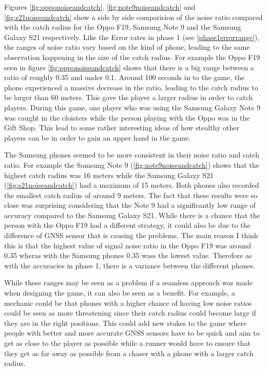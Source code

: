 \documentclass{l4proj}
\begin{document}
Figures \ref{fig:opponoiseandcatch}, \ref{fig:note9noiseandcatch} and \ref{fig:s21noiseandcatch} show a side by side comparision of the
noise ratio compared with the catch radius for the Oppo F19, Samsung Note 9 and the Samsung Galaxy S21 respectively. Like the Error rates in
phase 1 (see \ref{phase1errorrange}), the ranges of noise ratio vary based on the kind of phone, leading to the same observation happening in
the size of the catch radius. For example the Oppo F19 seen in figure \ref{fig:opponoiseandcatch} shows that there is a big range between a ratio
of roughly 0.35 and under 0.1. Around 100 seconds in to the game, the phone experienced a massive decrease in the ratio, leading to the catch radius
to be larger than 60 meters. This gave the player a larger radius in order to catch players. During this game, one player who was using the Samsung
Galaxy Note 9 was caught in the cloisters while the person playing with the Oppo was in the Gift Shop. This lead to some rather interesting ideas
of how stealthy other players can be in order to gain an upper hand in the game.

The Samsung phones seemed to be more consistent in their noise ratio and catch ratio. For example the Samsung Note 9 (\ref{fig:note9noiseandcatch})
shows that the highest catch radius was 16 meters while the Samsung Galaxy S21 (\ref{fig:s21noiseandcatch}) had a maximum of 15 meters. Both phones
also recorded the smallest catch radius of around 9 meters. The fact that these results were so close was surprising considering that the Note 9
had a significantly low range of accuracy compared to the Samsung Galaxy S21. While there is a chance that the person with the Oppo F19 had a different
strategy, it could also be due to the difference of GNSS sensor that is causing the problems. The main reason I think this is that the highest
value of signal noise ratio in the Oppo F19 was around 0.35 wheras with the Samsung phones 0.35 wass the lowest value. Therefore as with the accuracies
in phase 1, there is a variance between the different phones.

While these ranges may be seen as a problem if a seamless approach was made when designing the game, it can also be seen as a benefit. For
example, a mechanic could be that phones with a higher chance of having low noise ratios could be seen as more threatening since their catch
radius could become large if they are in the right positions. This could add new stakes to the game where people with better and more accurate
GNSS sensors have to be quick and aim to get as close to the player as possible while a runner would have to ensure that they get as far away
as possible from a chaser with a phone with a larger catch radius. 
\end{document}
